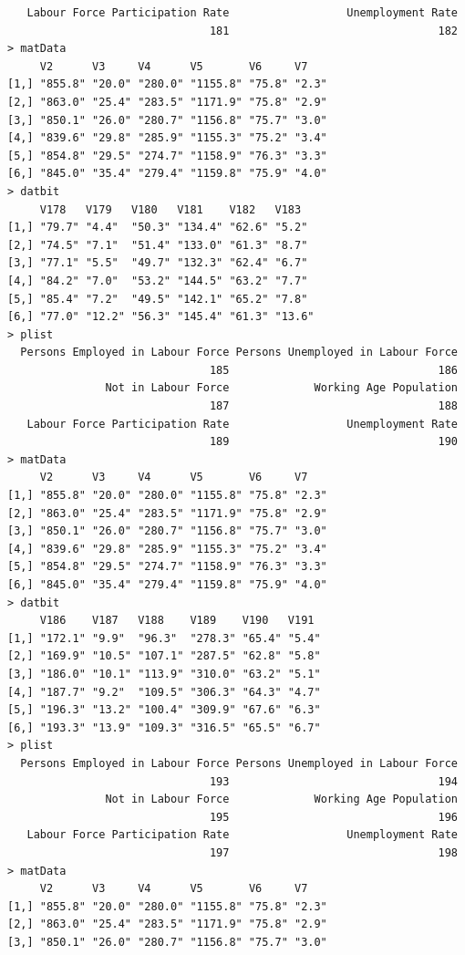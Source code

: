 \documentclass[a4paper]{article}
\begin{document}
\begin{verbatim}
   Labour Force Participation Rate                  Unemployment Rate 
                               181                                182 
> matData 
     V2      V3     V4      V5       V6     V7   
[1,] "855.8" "20.0" "280.0" "1155.8" "75.8" "2.3"
[2,] "863.0" "25.4" "283.5" "1171.9" "75.8" "2.9"
[3,] "850.1" "26.0" "280.7" "1156.8" "75.7" "3.0"
[4,] "839.6" "29.8" "285.9" "1155.3" "75.2" "3.4"
[5,] "854.8" "29.5" "274.7" "1158.9" "76.3" "3.3"
[6,] "845.0" "35.4" "279.4" "1159.8" "75.9" "4.0"
> datbit 
     V178   V179   V180   V181    V182   V183  
[1,] "79.7" "4.4"  "50.3" "134.4" "62.6" "5.2" 
[2,] "74.5" "7.1"  "51.4" "133.0" "61.3" "8.7" 
[3,] "77.1" "5.5"  "49.7" "132.3" "62.4" "6.7" 
[4,] "84.2" "7.0"  "53.2" "144.5" "63.2" "7.7" 
[5,] "85.4" "7.2"  "49.5" "142.1" "65.2" "7.8" 
[6,] "77.0" "12.2" "56.3" "145.4" "61.3" "13.6"
> plist 
  Persons Employed in Labour Force Persons Unemployed in Labour Force 
                               185                                186 
               Not in Labour Force             Working Age Population 
                               187                                188 
   Labour Force Participation Rate                  Unemployment Rate 
                               189                                190 
> matData 
     V2      V3     V4      V5       V6     V7   
[1,] "855.8" "20.0" "280.0" "1155.8" "75.8" "2.3"
[2,] "863.0" "25.4" "283.5" "1171.9" "75.8" "2.9"
[3,] "850.1" "26.0" "280.7" "1156.8" "75.7" "3.0"
[4,] "839.6" "29.8" "285.9" "1155.3" "75.2" "3.4"
[5,] "854.8" "29.5" "274.7" "1158.9" "76.3" "3.3"
[6,] "845.0" "35.4" "279.4" "1159.8" "75.9" "4.0"
> datbit 
     V186    V187   V188    V189    V190   V191 
[1,] "172.1" "9.9"  "96.3"  "278.3" "65.4" "5.4"
[2,] "169.9" "10.5" "107.1" "287.5" "62.8" "5.8"
[3,] "186.0" "10.1" "113.9" "310.0" "63.2" "5.1"
[4,] "187.7" "9.2"  "109.5" "306.3" "64.3" "4.7"
[5,] "196.3" "13.2" "100.4" "309.9" "67.6" "6.3"
[6,] "193.3" "13.9" "109.3" "316.5" "65.5" "6.7"
> plist 
  Persons Employed in Labour Force Persons Unemployed in Labour Force 
                               193                                194 
               Not in Labour Force             Working Age Population 
                               195                                196 
   Labour Force Participation Rate                  Unemployment Rate 
                               197                                198 
> matData 
     V2      V3     V4      V5       V6     V7   
[1,] "855.8" "20.0" "280.0" "1155.8" "75.8" "2.3"
[2,] "863.0" "25.4" "283.5" "1171.9" "75.8" "2.9"
[3,] "850.1" "26.0" "280.7" "1156.8" "75.7" "3.0"

\end{verbatim}
\end{document}
